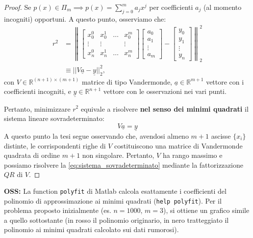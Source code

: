 \begin{proof}
Se $p(x) \in \Pi_m \implies p(x) = \sum_{j=0}^{m} a_j x^j$ per coefficienti $a_j$ (al momento incogniti) opportuni. A questo punto, osserviamo che:
\begin{align*}
    r^2 &= \left\| 
    \begin{bmatrix}
    x_0^0 & x_0^1 & \dots & x_0^m \\
    \vdots & \vdots & & \vdots \\
    x_n^0 & x_n^1 & \dots & x_n^m
    \end{bmatrix}
    \begin{bmatrix}
    a_0 \\ a_1 \\ \vdots \\ a_m
    \end{bmatrix}
    -
    \begin{bmatrix}
    y_0 \\ y_1 \\ \vdots \\ y_n
    \end{bmatrix}
    \right\|_2^2 \\[2ex]
    &\equiv || V\underline{a} - \underline{y} ||_2^2 ,
    \end{align*}
con $V \in \mathbb{R}^{(n+1) \times (m+1)}$ matrice di tipo Vandermonde, $\underline{a} \in \mathbb{R}^{m+1}$ vettore con i coefficienti incogniti, e $\underline{y} \in \mathbb{R}^{n+1}$ vettore con le osservazioni nei vari punti.

Pertanto, minimizzare $r^2$ equivale a risolvere \textbf{nel senso dei minimi quadrati} il sistema lineare sovradeterminato:
\begin{equation} \label{eq:sistema_sovradeterminato}
V\underline{a} = \underline{y}
\end{equation}
A questo punto la tesi segue osservando che, avendosi almeno $m+1$ ascisse $\{x_i\}$ distinte, le corrispondenti righe di $V$ costituiscono una matrice di Vandermonde quadrata di ordine $m+1$ non singolare. Pertanto, $V$ ha rango massimo e possiamo risolvere la \eqref{eq:sistema_sovradeterminato} mediante la fattorizzazione $QR$ di $V$.
\end{proof}

\textbf{OSS:} La function \texttt{polyfit} di Matlab calcola esattamente i coefficienti del polinomio di approssimazione ai minimi quadrati (\texttt{help polyfit}).
Per il problema proposto inizialmente (es. $n=1000$, $m=3$), si ottiene un grafico simile a quello sottostante (in rosso il polinomio originario, in nero tratteggiato il polinomio ai minimi quadrati calcolato sui dati rumorosi).

